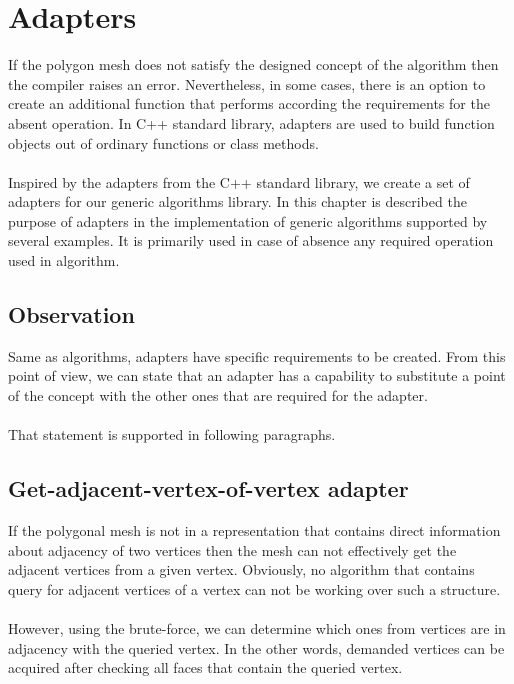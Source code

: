 \chapter{Adapters}
\label{chap:adapter_analysis}

If the polygon mesh does not satisfy the designed concept of the algorithm then the compiler
raises an error. Nevertheless, in some cases, there is an option to create an additional function
that performs according the requirements for the absent operation.
In C++ standard library, adapters are used to build function objects out of ordinary
functions or class methods\cite{Simonis2000}.\\
\\
Inspired by the adapters from the C++ standard library, we create a set of adapters
for our generic algorithms library.
In this chapter is described the purpose of adapters in the implementation of generic algorithms
supported by several examples. It is primarily used in case of absence any required operation
used in algorithm.

\section{Observation}

Same as algorithms, adapters have specific requirements to be created. From this point of view,
we can state that an adapter has a capability to substitute a point of the concept with
the other ones that are required for the adapter.\\
\\
That statement is supported in following paragraphs.

\section{Get-adjacent-vertex-of-vertex adapter}

If the polygonal mesh is not in a representation that contains direct information about adjacency of two
vertices then the mesh can not effectively 
get the adjacent vertices from a given vertex. Obviously, no algorithm that contains query for
adjacent vertices of a vertex can not be working over such a structure.\\
\\
However, using the brute-force, we can determine which ones from vertices are in adjacency with
the queried vertex. In the other words, demanded vertices can be acquired after checking all
faces that contain the queried vertex.

